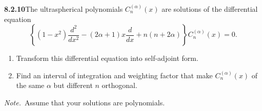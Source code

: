 \par\bigskip
\noindent\textbf{8.2.10}\quad The ultraspherical polynomials
$C_{n}^{(\alpha)}(x)$ are solutions of the differential equation
\[
\left\{(1-x^{2})\frac{d^{2}}{dx^{2}}-(2\alpha+1)x\frac{d}{dx}+n(n+2\alpha)
\right\}C_{n}^{(\alpha)}(x)=0.
\]
\begin{enumerate}
\item[(a)] Transform this differential equation into self-adjoint form.
\item[(b)] Find an interval of integration and weighting factor that make
  $C_{n}^{(\alpha)}(x)$ of the same $\alpha$ but different $n$ orthogonal.
\end{enumerate}
\emph{Note.}~Assume that your solutions are polynomials.
\solution
{}

